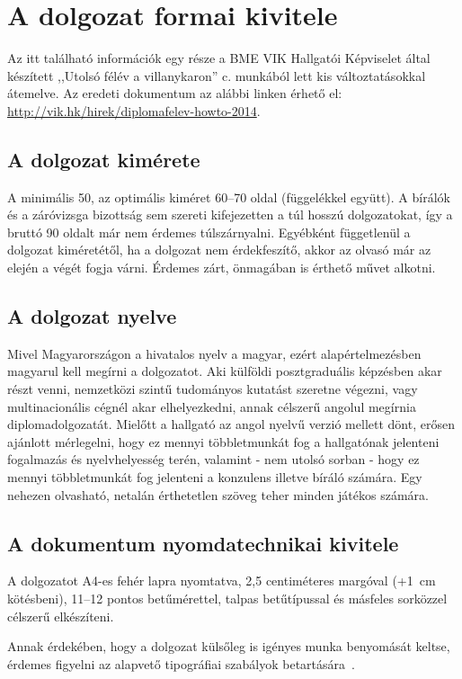 \chapter{A dolgozat formai kivitele}
Az itt található információk egy része a BME VIK Hallgatói Képviselet által készített ,,Utolsó félév a villanykaron'' c. munkából lett kis változtatásokkal átemelve. Az eredeti dokumentum az alábbi linken érhető el: \url{http://vik.hk/hirek/diplomafelev-howto-2014}.

\section{A dolgozat kimérete}
A minimális 50, az optimális kiméret 60--70 oldal (függelékkel együtt). A bírálók és a záróvizsga bizottság sem szereti kifejezetten a túl hosszú dolgozatokat, így a bruttó 90 oldalt már nem érdemes túlszárnyalni. Egyébként függetlenül a dolgozat kiméretétől, ha a dolgozat nem érdekfeszítő, akkor az olvasó már az elején a végét fogja várni. Érdemes zárt, önmagában is érthető művet alkotni.

\section{A dolgozat nyelve}
Mivel Magyarországon a hivatalos nyelv a magyar, ezért alapértelmezésben magyarul kell megírni a dolgozatot. Aki külföldi posztgraduális képzésben akar részt venni, nemzetközi szintű tudományos kutatást szeretne végezni, vagy multinacionális cégnél akar elhelyezkedni, annak célszerű angolul megírnia diplomadolgozatát. Mielőtt a hallgató az angol nyelvű verzió mellett dönt, erősen ajánlott mérlegelni, hogy ez mennyi többletmunkát fog a hallgatónak jelenteni fogalmazás és nyelvhelyesség terén, valamint - nem utolsó sorban - hogy ez mennyi többletmunkát fog jelenteni a konzulens illetve bíráló számára. Egy nehezen olvasható, netalán érthetetlen szöveg teher minden játékos számára.

\section{A dokumentum nyomdatechnikai kivitele}
A dolgozatot A4-es fehér lapra nyomtatva, 2,5 centiméteres margóval (+1~cm kötésbeni), 11--12 pontos betűmérettel, talpas betűtípussal és másfeles sorközzel célszerű elkészíteni.

Annak érdekében, hogy a dolgozat külsőleg is igényes munka benyomását keltse, érdemes figyelni az alapvető tipográfiai szabályok betartására~\cite{Jeney}.
